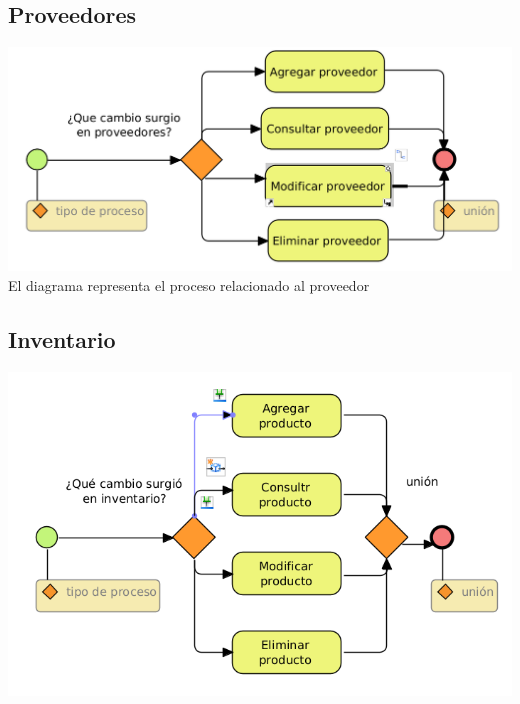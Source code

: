 \begin{flushleft}

	\subsection{Proveedores}
	 
	\begin{center}
	
	\includegraphics[width=14cm]{proceso/images/a.d.proveedores.png}\\	
	
	\normalsize{El diagrama representa el proceso relacionado al proveedor}
	\end{center}
		

	\subsection{Inventario}
	 
	\begin{center}
	
	\includegraphics[width=14cm]{proceso/images/a.e.inventario.png}\\	
	

\end{center}
\end{flushleft}
